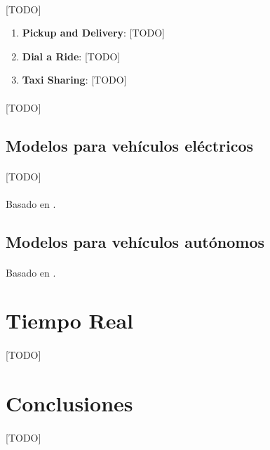 \documentclass{subfiles}
\begin{document}
        \paragraph{}
        [TODO]

        \begin{enumerate}

          \item \textbf{Pickup and Delivery}: [TODO]

          \item \textbf{Dial a Ride}: [TODO]

          \item \textbf{Taxi Sharing}: [TODO]

        \end{enumerate}

        \paragraph{}
        [TODO]

      \subsection{Modelos para vehículos eléctricos}
      \label{sec:formulation_extensions_electric}

        \paragraph{}
        [TODO]

        \paragraph{}
        Basado en \cite{erdougan2012green}.

      \subsection{Modelos para vehículos autónomos}
      \label{sec:formulation_extensions_autonomous}

        \paragraph{}
        Basado en \cite{dial1995autonomous,bongiovanni2019electric}.



    \section{Tiempo Real}
    \label{sec:formulation_real_time}

      \paragraph{}
      [TODO]

    \section{Conclusiones}
    \label{sec:formulation_conclusions}

      \paragraph{}
      [TODO]
\end{document}
